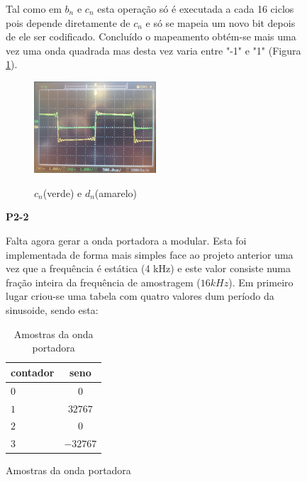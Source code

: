 \documentclass[11pt]{article}
\begin{document}
\begin{figure}[H]
Tal como em $b_n$ e $c_n$ esta operação só é executada a cada 16 ciclos pois depende diretamente de $c_n$ e só se mapeia um novo bit depois de ele ser codificado. Concluído o mapeamento obtém-se mais uma vez uma onda quadrada mas desta vez varia entre "-1" e "1" (Figura \ref{cn_dn}).
\begin{figure}[H]
	\centering
	\includegraphics[width=0.5\textwidth]{./cn_dn}~\\
	\caption{$ c_n $(verde) e $ d_n $(amarelo)}
	\label{cn_dn}
\end{figure}
\textbf{P2-2}

Falta agora gerar a onda portadora a modular. Esta foi implementada de forma mais simples face ao projeto anterior uma vez que a frequência é estática (4 kHz) e este valor consiste numa fração inteira da frequência de amostragem ($16 kHz$).
Em primeiro lugar criou-se uma tabela com quatro valores dum período da sinusoide, sendo esta:
\begin{table}[H]
	\centering
	\caption{Amostras da onda portadora}
	\label{tab:amostras}
	\begin{tabular}[c]{|l||c|}
		\hline \textbf{contador} & \textbf{seno}\\ 
		\hline $ 0 $ & $ 0 $\\ 
		\hline $ 1 $ & $ 32767 $  \\ 
		\hline $ 2 $ & $ 0 $ \\ 
		\hline $ 3 $ & $ -32767 $ \\
		\hline
	\end{tabular}
\end{table}


\end{figure}
\end{document}
